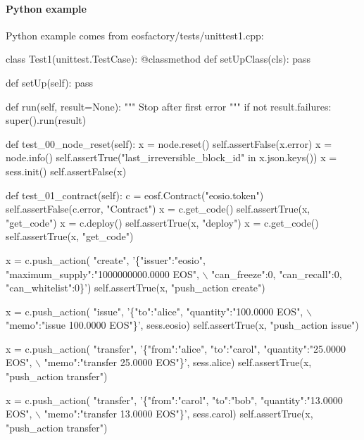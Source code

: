 \paragraph*{Python example}

Python example comes from {\ttfamily eosfactory/tests/unittest1.\+cpp}\+:


\begin{DoxyCode}
class Test1(unittest.TestCase):
    @classmethod
    def setUpClass(cls):
        pass

    def setUp(self):
        pass

    def run(self, result=None):
        """ Stop after first error """      
        if not result.failures:
            super().run(result)

    def test\_00\_node\_reset(self):
        x = node.reset()
        self.assertFalse(x.error)
        x = node.info()
        self.assertTrue("last\_irreversible\_block\_id" in x.json.keys())
        x = sess.init()
        self.assertFalse(x)

    def test\_01\_contract(self):
        c = eosf.Contract("eosio.token")
        self.assertFalse(c.error, "Contract")
        x = c.get\_code()
        self.assertTrue(x, "get\_code")
        x = c.deploy()
        self.assertTrue(x, "deploy")
        x = c.get\_code()
        self.assertTrue(x, "get\_code") 

        x = c.push\_action(
            "create", 
            '\{"issuer":"eosio", "maximum\_supply":"1000000000.0000 EOS", \(\backslash\)
                "can\_freeze":0, "can\_recall":0, "can\_whitelist":0\}') 
        self.assertTrue(x, "push\_action create")

        x = c.push\_action(
            "issue", 
            '\{"to":"alice", "quantity":"100.0000 EOS", \(\backslash\)
                "memo":"issue 100.0000 EOS"\}', 
            sess.eosio)
        self.assertTrue(x, "push\_action issue")

        x = c.push\_action(
            "transfer", 
            '\{"from":"alice", "to":"carol", "quantity":"25.0000 EOS", \(\backslash\)
                "memo":"transfer 25.0000 EOS"\}', 
            sess.alice)
        self.assertTrue(x, "push\_action transfer")

        x = c.push\_action(
            "transfer", 
            '\{"from":"carol", "to":"bob", "quantity":"13.0000 EOS", \(\backslash\)
                "memo":"transfer 13.0000 EOS"\}', 
            sess.carol)
        self.assertTrue(x, "push\_action transfer")


\end{DoxyCode}
